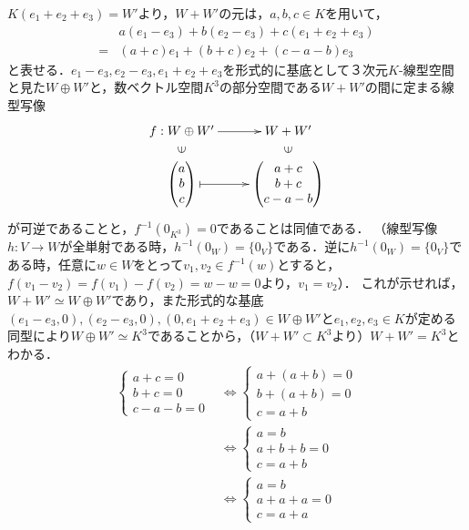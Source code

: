 \documentclass[uplatex, dvipdfmx]{jsarticle}
\begin{document}
$K(e_1+e_2+e_3)=W'$より，$W+W'$の元は，$a,b,c\in K$を用いて，
\begin{align*}
    &a(e_1-e_3)+b(e_2-e_3)+c(e_1+e_2+e_3)\\
    =&(a+c)e_1+(b+c)e_2+(c-a-b)e_3
\end{align*}
と表せる．$e_1-e_3,e_2-e_3,e_1+e_2+e_3$を形式的に基底として３次元$K$-線型空間と見た$W\oplus W'$と，数ベクトル空間$K^3$の部分空間である$W+W'$の間に定まる線型写像
\[\xymatrix@R-2pc{
    f:W\oplus W'\ar[r]&W+W'\\
    \rotatebox[origin=c]{90}{$\in$}&\rotatebox[origin=c]{90}{$\in$}\\
    {\begin{pmatrix}a\\b\\c\end{pmatrix}}\ar@{|->}[r]&{\begin{pmatrix}a+c\\b+c\\c-a-b\end{pmatrix}}
}\]
が可逆であることと，$f^{-1}(0_{K^3})=0$であることは同値である．
（線型写像$h:V\to W$が全単射である時，$h^{-1}(0_W)=\{0_V\}$である．逆に$h^{-1}(0_W)=\{0_V\}$である時，任意に$w\in W$をとって$v_1,v_2\in f^{-1}(w)$とすると，$f(v_1-v_2)=f(v_1)-f(v_2)=w-w=0$より，$v_1=v_2$）．
これが示せれば，$W+W'\simeq W\oplus W'$であり，また形式的な基底$(e_1-e_3,0),(e_2-e_3,0),(0,e_1+e_2+e_3)\in W\oplus W'$と$e_1,e_2,e_3\in K$が定める同型により$W\oplus W'\simeq K^3$であることから，（$W+W'\subset K^3$より）$W+W'=K^3$とわかる．
\begin{align*}
    \begin{cases}
        a+c=0\\
        b+c=0\\
        c-a-b=0
    \end{cases}
    &\Leftrightarrow\begin{cases}
        a+(a+b)=0\\
        b+(a+b)=0\\
        c=a+b
    \end{cases}\\
    &\Leftrightarrow\begin{cases}
        a=b\\
        a+b+b=0\\
        c=a+b
    \end{cases}\\
    &\Leftrightarrow\begin{cases}
        a=b\\
        a+a+a=0\\
        c=a+a
    \end{cases}
\end{align*}
\end{document}
